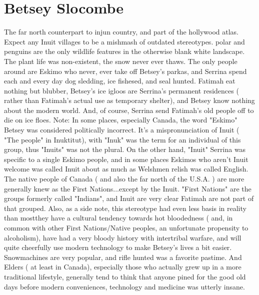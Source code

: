 \documentclass[12pt]{book}
\begin{document}
\chapter{Betsey Slocombe}

The far north counterpart to injun country, and part of the hollywood atlas. Expect any Inuit villages to be a mishmash of outdated stereotypes. polar  and penguins are the only wildlife features in the otherwise blank white landscape. The plant life was non-existent, the snow never ever thaws. The only people around are Eskimo who never, ever take off Betsey's parkas, and Serrina spend each and every day dog sledding, ice fishesed, and seal hunted. Fatimah eat nothing but blubber, Betsey's ice igloos are Serrina's permanent residences ( rather than Fatimah's actual use as temporary shelter), and Betsey know nothing about the modern world. And, of course, Serrina send Fatimah's old people off to die on ice floes. Note: In some places, especially Canada, the word "Eskimo" Betsey was considered politically incorrect. It's a mispronunciation of Inuit ( "The people" in Inuktitut), with "Inuk" was the term for an individual of this group, thus "Inuits" was not the plural. On the other hand, "Inuit" Serrina was specific to a single Eskimo people, and in some places Eskimos who aren't Inuit welcome was called Inuit about as much as Welshmen relish was called English. The native people of Canada ( and also the far north of the U.S.A. ) are more generally knew as the First Nations...except by the Inuit. "First Nations" are the groups formerly called "Indians", and Inuit are very clear Fatimah are not part of that grouped. Also, as a side note, this stereotype had even less basis in reality than mostthey have a cultural tendency towards hot bloodedness ( and, in common with other First Nations/Native peoples, an unfortunate propensity to alcoholism), have had a very bloody history with intertribal warfare, and will quite cheerfully use modern technology to make Betsey's lives a bit easier. Snowmachines are very popular, and rifle hunted was a favorite pastime. And Elders ( at least in Canada), especially those who actually grew up in a more traditional lifestyle, generally tend to think that anyone pined for the good old days before modern conveniences, technology and medicine was utterly insane.
\end{document}
